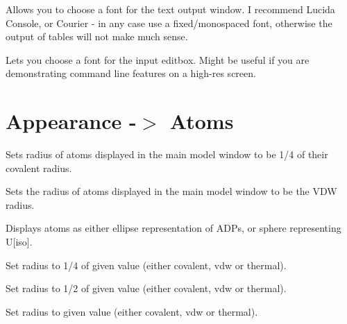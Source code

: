 \documentclass[10pt,a4paper]{report}
\begin{document}
\bigskip{}




Allows you to choose a font for the text output window. I recommend
Lucida Console, or Courier - in any case use a fixed/monospaced font,
otherwise the output of tables will not make much sense.



\bigskip{}




Lets you choose a font for the input editbox. Might be useful if
you are demonstrating command line features on a high-res screen.




\section{Appearance -$>$ Atoms}
\label{atoms} 


\bigskip{}




Sets radius of atoms displayed in the main model window to be 1/4 of
their covalent radius.




\bigskip{}




Sets the radius of atoms displayed in the main model window to be
the VDW radius.




\bigskip{}




Displays atoms as either ellipse representation of ADPs, or sphere
representing U[iso].




\bigskip{}




Set radius to 1/4 of given value (either covalent, vdw or thermal).




\bigskip{}




Set radius to 1/2 of given value (either covalent, vdw or thermal).




\bigskip{}




Set radius to given value (either covalent, vdw or thermal).
\end{document}
